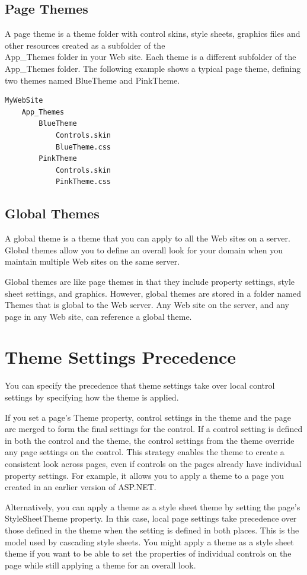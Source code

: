 \subsection{Page Themes}
A page theme is a theme folder with control skins, style sheets, graphics files and other resources created as a subfolder of the \\App\_Themes folder in your Web site. Each theme is a different subfolder of the \\App\_Themes folder. The following example shows a typical page theme, defining two themes named BlueTheme and PinkTheme.
\begin{lstlisting}
MyWebSite
	App_Themes
		BlueTheme
			Controls.skin
			BlueTheme.css
		PinkTheme
			Controls.skin
			PinkTheme.css
\end{lstlisting}

\subsection{Global Themes}
A global theme is a theme that you can apply to all the Web sites on a server. Global themes allow you to define an overall look for your domain when you maintain multiple Web sites on the same server.

Global themes are like page themes in that they include property settings, style sheet settings, and graphics. However, global themes are stored in a folder named Themes that is global to the Web server. Any Web site on the server, and any page in any Web site, can reference a global theme.

\section{Theme Settings Precedence}
You can specify the precedence that theme settings take over local control settings by specifying how the theme is applied.

If you set a page's Theme property, control settings in the theme and the page are merged to form the final settings for the control. If a control setting is defined in both the control and the theme, the control settings from the theme override any page settings on the control. This strategy enables the theme to create a consistent look across pages, even if controls on the pages already have individual property settings. For example, it allows you to apply a theme to a page you created in an earlier version of ASP.NET.

Alternatively, you can apply a theme as a style sheet theme by setting the page's StyleSheetTheme property. In this case, local page settings take precedence over those defined in the theme when the setting is defined in both places. This is the model used by cascading style sheets. You might apply a theme as a style sheet theme if you want to be able to set the properties of individual controls on the page while still applying a theme for an overall look.

